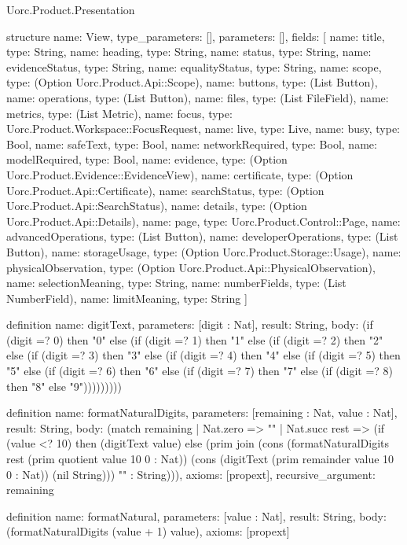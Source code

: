 \begin{lexlean}{Uorc.Product.Presentation}
\begin{semanticmodule}
structure{
  name: View,
  type_parameters: [],
  parameters: [],
  fields: [
    {name: title, type: String},
    {name: heading, type: String},
    {name: status, type: String},
    {name: evidenceStatus, type: String},
    {name: equalityStatus, type: String},
    {name: scope, type: (Option Uorc.Product.Api::Scope)},
    {name: buttons, type: (List Button)},
    {name: operations, type: (List Button)},
    {name: files, type: (List FileField)},
    {name: metrics, type: (List Metric)},
    {name: focus, type: Uorc.Product.Workspace::FocusRequest},
    {name: live, type: Live},
    {name: busy, type: Bool},
    {name: safeText, type: Bool},
    {name: networkRequired, type: Bool},
    {name: modelRequired, type: Bool},
    {name: evidence, type: (Option Uorc.Product.Evidence::EvidenceView)},
    {name: certificate, type: (Option Uorc.Product.Api::Certificate)},
    {name: searchStatus, type: (Option Uorc.Product.Api::SearchStatus)},
    {name: details, type: (Option Uorc.Product.Api::Details)},
    {name: page, type: Uorc.Product.Control::Page},
    {name: advancedOperations, type: (List Button)},
    {name: developerOperations, type: (List Button)},
    {name: storageUsage, type: (Option Uorc.Product.Storage::Usage)},
    {name: physicalObservation, type: (Option Uorc.Product.Api::PhysicalObservation)},
    {name: selectionMeaning, type: String},
    {name: numberFields, type: (List NumberField)},
    {name: limitMeaning, type: String}
  ]
}

definition{
  name: digitText,
  parameters: [digit : Nat],
  result: String,
  body: (if (digit =? 0) then "0" else (if (digit =? 1) then "1" else (if (digit =? 2) then "2" else (if (digit =? 3) then "3" else (if (digit =? 4) then "4" else (if (digit =? 5) then "5" else (if (digit =? 6) then "6" else (if (digit =? 7) then "7" else (if (digit =? 8) then "8" else "9")))))))))
}

definition{
  name: formatNaturalDigits,
  parameters: [remaining : Nat, value : Nat],
  result: String,
  body: (match remaining
    | Nat.zero => ""
    | Nat.succ rest => (if (value <? 10) then (digitText value) else (prim join (cons (formatNaturalDigits rest (prim quotient value 10 0 : Nat)) (cons (digitText (prim remainder value 10 0 : Nat)) (nil String))) "" : String))),
  axioms: [propext],
  recursive_argument: remaining
}

definition{
  name: formatNatural,
  parameters: [value : Nat],
  result: String,
  body: (formatNaturalDigits (value + 1) value),
  axioms: [propext]
}


\end{semanticmodule}
\end{lexlean}
